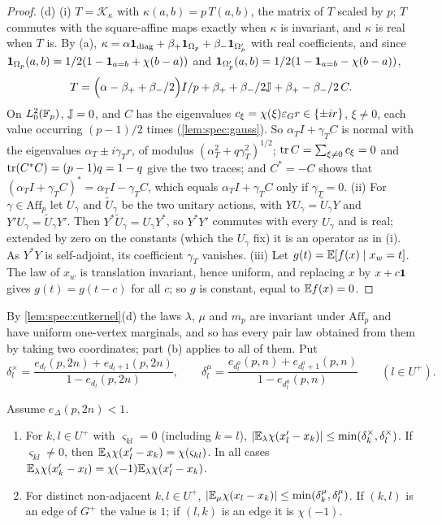 \begin{proof}
(d) (i) $T=\mathcal K_\kappa$ with $\kappa(a,b)=p\,T(a,b)$, the matrix of $T$ scaled by
$p$; $T$ commutes with the square-affine maps exactly when $\kappa$ is invariant, and
$\kappa$ is real when $T$ is. By (a), $\kappa=\alpha\mathbf 1_{\rm diag}+\beta_+\mathbf 1_{\Omega_{p}}+\beta_-\mathbf 1_{\Omega_{p}'}$
with real coefficients, and since
$\mathbf 1_{\Omega_{p}}(a,b)=1/2(1-\mathbf 1_{a=b}+\chi(b-a))$ and
$\mathbf 1_{\Omega_{p}'}(a,b)=1/2(1-\mathbf 1_{a=b}-\chi(b-a))$,
\[
  T=\Big(\alpha-\beta_++\beta_-/2\Big)I/p+\beta_++\beta_-/2\mathbb J
  +\beta_+-\beta_-/2\,C .
\]
On $L^2_0(\mathbb F_p)$, $\mathbb J=0$, and $C$ has the eigenvalues $c_\xi=\chi(\xi)\varepsilon_Gr\in\{\pm ir\}$,
$\xi\ne0$, each value occurring $(p-1)/2$ times (\cref{lem:spec:gauss}). So
$\alpha_TI+\gamma_TC$ is normal with the eigenvalues $\alpha_T\pm i\gamma_Tr$, of modulus
$(\alpha_T^2+q\gamma_T^2)^{1/2}$; $\operatorname{tr} C=\sum_{\xi\ne0}c_\xi=0$ and
$\operatorname{tr}(C^*C)=(p-1)q=1-q$ give the two traces; and $C^*=-C$ shows that
$(\alpha_TI+\gamma_TC)^*=\alpha_TI-\gamma_TC$, which equals $\alpha_TI+\gamma_TC$ only if
$\gamma_T=0$. (ii) For $\gamma\in\mathrm{Aff}_p$ let $U_\gamma$ and $\tilde U_\gamma$ be the
two unitary actions, with $YU_\gamma=\tilde U_\gamma Y$ and $Y'U_\gamma=\tilde U_\gamma Y'$. Then
$Y^*\tilde U_\gamma=U_\gamma Y^*$, so $Y^*Y'$ commutes with every $U_\gamma$ and is real;
extended by zero on the constants (which the $U_\gamma$ fix) it is an operator as in (i).
As $Y^*Y$ is self-adjoint, its coefficient $\gamma_T$ vanishes. (iii) Let
$g(t)=\mathbb E[f(x)\mid x_w=t]$. The law of $x_w$ is translation invariant, hence uniform, and
replacing $x$ by $x+c\mathbf 1$ gives $g(t)=g(t-c)$ for all $c$; so $g$ is constant, equal to
$\mathbb E f(x)=0$.
\end{proof}

By \cref{lem:spec:cutkernel}(d) the laws $\lambda$, $\mu$ and $m_p$ are invariant
under $\mathrm{Aff}_p$ and have uniform one-vertex marginals, and so has every
pair law obtained from them by taking two coordinates; part (b) applies to all
of them. Put
\begin{equation}\label{eq:spec:smallconst}
  \delta^\times_l=\frac{e_{d_l}(p,2n)+e_{d_l+1}(p,2n)}{1-e_{d_l}(p,2n)},\qquad
  \delta^\mu_l=\frac{e_{d^0_l}(p,n)+e_{d^0_l+1}(p,n)}{1-e_{d^0_l}(p,n)}\qquad(l\in U^+).
\end{equation}

\begin{lemma}\label{lem:spec:small}
Assume $e_\Delta(p,2n)<1$.
\begin{enumerate}[label=\textup{(\alph*)}]
\item For $k,l\in U^+$ with $\varsigma_{kl}=0$ (including $k=l$),
  $|\mathbb E_\lambda\chi(x'_l-x_k)|\le\min(\delta^\times_k,\delta^\times_l)$. If
  $\varsigma_{kl}\ne0$, then $\mathbb E_\lambda\chi(x'_l-x_k)=\chi(\varsigma_{kl})$. In all
  cases $\mathbb E_\lambda\chi(x'_k-x_l)=\chi(-1)\mathbb E_\lambda\chi(x'_l-x_k)$.
\item For distinct non-adjacent $k,l\in U^+$,
  $|\mathbb E_\mu\chi(x_l-x_k)|\le\min(\delta^\mu_k,\delta^\mu_l)$. If $(k,l)$ is an edge of
  $G^+$ the value is $1$; if $(l,k)$ is an edge it is $\chi(-1)$.
\end{enumerate}
\end{lemma}

